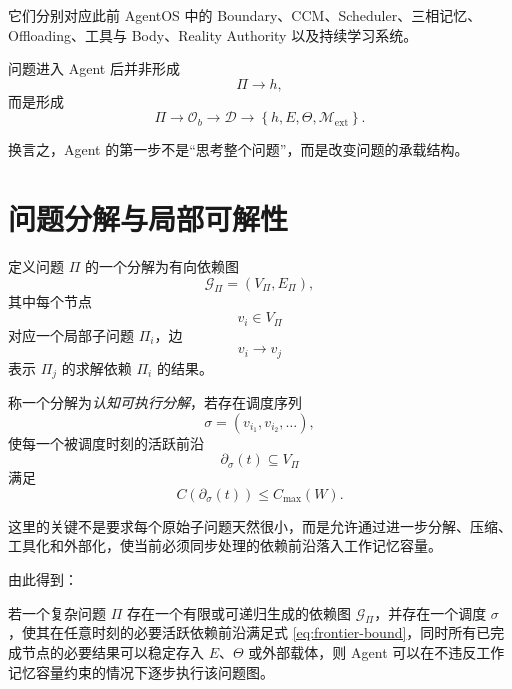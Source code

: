 它们分别对应此前 AgentOS 中的 Boundary、CCM、Scheduler、三相记忆、Offloading、工具与 Body、Reality Authority 以及持续学习系统。

问题进入 Agent 后并非形成
\begin{equation}
\Pi\rightarrow h,
\end{equation}
而是形成
\begin{equation}
\Pi
\rightarrow
\mathcal O_b
\rightarrow
\mathcal D
\rightarrow
\left\{
h,E,\Theta,\mathcal M_{\mathrm{ext}}
\right\}.
\end{equation}

换言之，Agent 的第一步不是“思考整个问题”，而是改变问题的承载结构。

\section{问题分解与局部可解性}

定义问题 $\Pi$ 的一个分解为有向依赖图
\begin{equation}
\mathcal G_\Pi
=
(V_\Pi,E_\Pi),
\end{equation}
其中每个节点
\begin{equation}
v_i\in V_\Pi
\end{equation}
对应一个局部子问题 $\Pi_i$，边
\begin{equation}
v_i\rightarrow v_j
\end{equation}
表示 $\Pi_j$ 的求解依赖 $\Pi_i$ 的结果。

称一个分解为\emph{认知可执行分解}，若存在调度序列
\begin{equation}
\sigma
=
(v_{i_1},v_{i_2},\ldots),
\end{equation}
使每一个被调度时刻的活跃前沿
\begin{equation}
\partial_\sigma(t)
\subseteq V_\Pi
\end{equation}
满足
\begin{equation}
C\left(
\partial_\sigma(t)
\right)
\leq
C_{\max}(W).
\label{eq:frontier-bound}
\end{equation}

这里的关键不是要求每个原始子问题天然很小，而是允许通过进一步分解、压缩、工具化和外部化，使当前必须同步处理的依赖前沿落入工作记忆容量。

由此得到：

\begin{theorem}[有限前沿可执行定理]
若一个复杂问题 $\Pi$ 存在一个有限或可递归生成的依赖图 $\mathcal G_\Pi$，并存在一个调度 $\sigma$，使其在任意时刻的必要活跃依赖前沿满足式 \eqref{eq:frontier-bound}，同时所有已完成节点的必要结果可以稳定存入 $E$、$\Theta$ 或外部载体，则 Agent 可以在不违反工作记忆容量约束的情况下逐步执行该问题图。
\end{theorem}

